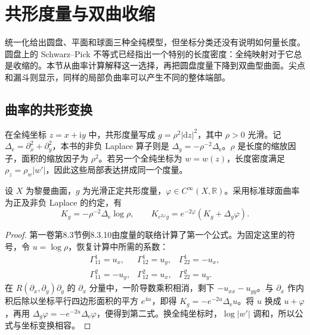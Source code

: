 
% 
% 

\section{共形度量与双曲收缩}
\label{g4:sec:0504}

统一化给出圆盘、平面和球面三种全纯模型，但坐标分类还没有说明如何量长度。圆盘上的 Schwarz--Pick 不等式已经指出一个特别的长度密度：全纯映射对于它总是收缩的。本节从曲率计算解释这一选择，再把圆盘度量下降到双曲型曲面。尖点和漏斗则显示，同样的局部负曲率可以产生不同的整体端部。

\subsection{曲率的共形变换}
\label{g4:subsec:0504:01}

在全纯坐标 \(z=x+\mathrm{i}y\) 中，共形度量写成 \(g=\rho^2|\mathrm{d}z|^2\)，其中 \(\rho>0\) 光滑。记 \(\Delta_{\mathrm e}=\partial_x^2+\partial_y^2\)，本书的非负 Laplace 算子则是 \(\Delta_g=-\rho^{-2}\Delta_{\mathrm e}\)。\(\rho\) 是长度的缩放因子，面积的缩放因子为 \(\rho^2\)。若另一个全纯坐标为 \(w=w(z)\)，长度密度满足 \(\rho_z=\rho_w|w'|\)，因此这些局部表达拼成同一个度量。

\begin{proposition}
	\label{g4:prop:0504:conformal-curvature}
	设 \(X\) 为黎曼曲面，\(g\) 为光滑正定共形度量，\(\varphi\in C^\infty(X,\mathbb R)\)。采用标准球面曲率为正及非负 Laplace 的约定，有
	\begin{equation}
		\label{g4:eq:0504:curvature-change}
		K_g=-\rho^{-2}\Delta_{\mathrm e}\log\rho,
		\qquad K_{e^{2\varphi}g}=e^{-2\varphi}(K_g+\Delta_g\varphi).
	\end{equation}
\end{proposition}
\begin{proof}
	第一卷第8.3节例8.3.10由度量的联络计算了第一个公式。为固定这里的符号，令 \(u=\log\rho\)，恢复计算中所需的系数：
	\[
		\begin{array}{lll}
			\Gamma^1_{11}=u_x,&\Gamma^1_{12}=u_y,&\Gamma^1_{22}=-u_x,\\
			\Gamma^2_{11}=-u_y,&\Gamma^2_{12}=u_x,&\Gamma^2_{22}=u_y.
		\end{array}
	\]
	在 \(R(\partial_x,\partial_y)\partial_y\) 的 \(\partial_x\) 分量中，一阶导数乘积相消，剩下 \(-u_{xx}-u_{yy}\)。与 \(\partial_x\) 作内积后除以坐标平行四边形面积的平方 \(e^{4u}\)，即得 \(K_g=-e^{-2u}\Delta_{\mathrm e}u\)。将 \(u\) 换成 \(u+\varphi\)，再用 \(\Delta_g\varphi=-e^{-2u}\Delta_{\mathrm e}\varphi\)，便得到第二式。换全纯坐标时，\(\log|w'|\) 调和，所以公式与坐标变换相容。
\end{proof}

